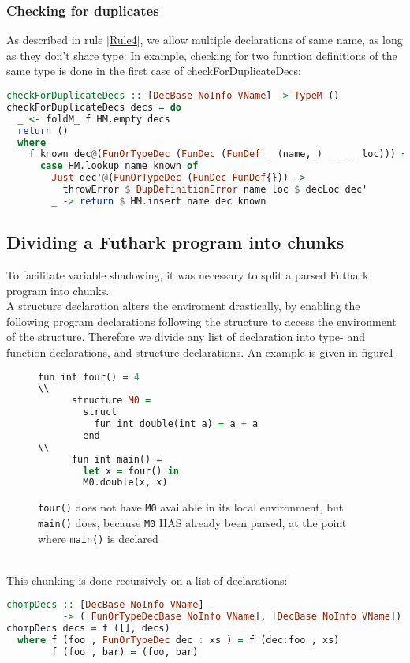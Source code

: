 \subsubsection{Checking for duplicates}
\label{subsec:checkingforduplicates}
As described in rule \ref{Rule4}, we allow multiple declarations of same name,
as long as they don't share type:
In example, checking for two function definitions of the same type is done in
the first case of checkForDuplicateDecs:
\begin{lstlisting}[language=Haskell]
checkForDuplicateDecs :: [DecBase NoInfo VName] -> TypeM ()
checkForDuplicateDecs decs = do
  _ <- foldM_ f HM.empty decs
  return ()
  where
    f known dec@(FunOrTypeDec (FunDec (FunDef _ (name,_) _ _ _ loc))) =
      case HM.lookup name known of
        Just dec'@(FunOrTypeDec (FunDec FunDef{})) ->
          throwError $ DupDefinitionError name loc $ decLoc dec'
        _ -> return $ HM.insert name dec known
\end{lstlisting}
\subsection{Dividing a Futhark program into chunks}
To facilitate variable shadowing, it was necessary to split a parsed Futhark
program into chunks.
\\
A structure declaration alters the enviroment drastically, by enabling the
following program declarations following the structure to access the environment
of the structure.
Therefore we divide any list of declaration into type- and function
declarations, and structure declarations.
An example is given in figure\ref{chunks}
\begin{figure}\label{chunks}
  \begin{tcolorbox}
    \begin{lstlisting}[language=Haskell]
      fun int four() = 4
\\
      structure M0 =
        struct
          fun int double(int a) = a + a
        end
\\
      fun int main() =
        let x = four() in
        M0.double(x, x)
  \end{lstlisting}
  \texttt{four()} does not have \texttt{M0} available in its local environment, but
    \texttt{main()} does, because \texttt{M0} HAS already been parsed, at the point where
    \texttt{main()} is declared
  \end{tcolorbox}
\end{figure}
\\
This chunking is done recursively on a list of declarations:
\begin{lstlisting}[language=Haskell]
chompDecs :: [DecBase NoInfo VName]
          -> ([FunOrTypeDecBase NoInfo VName], [DecBase NoInfo VName])
chompDecs decs = f ([], decs)
  where f (foo , FunOrTypeDec dec : xs ) = f (dec:foo , xs)
        f (foo , bar) = (foo, bar)
\end{lstlisting}
